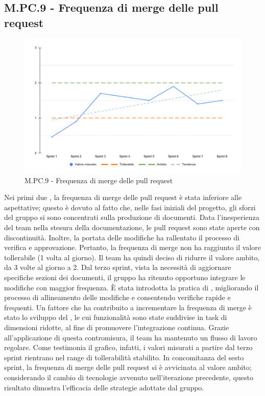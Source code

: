 \subsection{M.PC.9 - Frequenza di merge delle pull request}
\begin{figure}[H]
    \centering
    \includegraphics[width=\textwidth]{assets/frequenza_pull_request.pdf}
    \caption{M.PC.9 - Frequenza di merge delle pull request}
\end{figure}

\par Nei primi due , la frequenza di merge delle pull request è stata inferiore alle aspettative; questo è dovuto al fatto che, nelle fasi iniziali del progetto, gli sforzi del gruppo si sono concentrati sulla produzione di documenti. Data l’inesperienza del team nella stesura della documentazione, le pull request sono state aperte con discontinuità. Inoltre, la portata delle modifiche ha rallentato il processo di verifica e approvazione. Pertanto, la frequenza di merge non ha raggiunto il valore tollerabile (1 volta al giorno). Il team ha quindi deciso di ridurre il valore ambito, da 3 volte al giorno a 2. Dal terzo sprint, vista la necessità di aggiornare specifiche sezioni dei documenti, il gruppo ha ritenuto opportuno integrare le modifiche con maggior frequenza. È stata introdotta la pratica di , migliorando il processo di allineamento delle modifiche e consentendo verifiche rapide e frequenti. Un fattore che ha contribuito a incrementare la frequenza di merge è stato lo sviluppo del , le cui funzionalità sono state suddivise in task di dimensioni ridotte, al fine di promuovere l'integrazione continua. Grazie all’applicazione di questa contromisura, il team ha mantenuto un flusso di lavoro regolare. Come testimonia il grafico, infatti, i valori misurati a partire dal terzo sprint rientrano nel range di tollerabilità stabilito. In concomitanza del sesto sprint, la frequenza di merge delle pull request si è avvicinata al valore ambito; considerando il cambio di tecnologie avvenuto nell’iterazione precedente, questo risultato dimostra l’efficacia delle strategie adottate dal gruppo.
